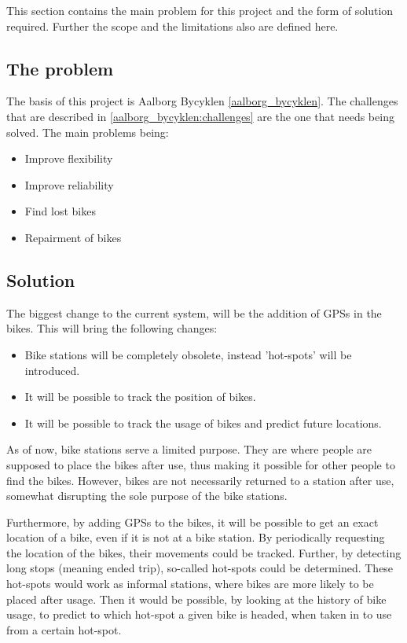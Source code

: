 This section contains the main problem for this project and the form of solution required.
Further the scope and the limitations also are defined here.
\subsection{The problem}
The basis of this project is Aalborg Bycyklen \cref{aalborg_bycyklen}.
The challenges that are described in \cref{aalborg_bycyklen:challenges} are the one that needs being solved.
The main problems being:
\begin{itemize}
\item Improve flexibility
\item Improve reliability
\item Find lost bikes
\item Repairment of bikes
\end{itemize}

\subsection{Solution}
The biggest change to the current system, will be the addition of GPSs in the bikes.
This will bring the following changes:
\begin{itemize}
\item Bike stations will be completely obsolete, instead 'hot-spots' will be introduced.
\item It will be possible to track the position of bikes.
\item It will be possible to track the usage of bikes and predict future locations.
\end{itemize}

As of now, bike stations serve a limited purpose.
They are where people are supposed to place the bikes after use, thus making it possible for other people to find the bikes.
However, bikes are not necessarily returned to a station after use, somewhat disrupting the sole purpose of the bike stations.

Furthermore, by adding GPSs to the bikes, it will be possible to get an exact location of a bike, even if it is not at a bike station.
By periodically requesting the location of the bikes, their movements could be tracked.
Further, by detecting long stops (meaning ended trip), so-called hot-spots could be determined.
These hot-spots would work as informal stations, where bikes are more likely to be placed after usage.
Then it would be possible, by looking at the history of bike usage, to predict to which hot-spot a given bike is headed, when taken in to use from a certain hot-spot.

